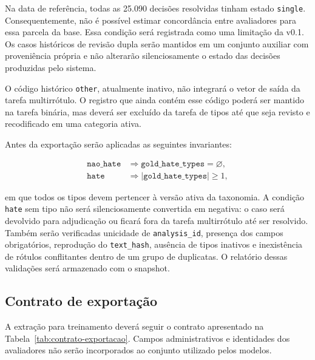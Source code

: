 Na data de referência, todas as 25.090 decisões resolvidas tinham estado
\texttt{single}. Consequentemente, não é possível estimar concordância entre
avaliadores para essa parcela da base. Essa condição será registrada como uma
limitação da v0.1. Os casos históricos de revisão dupla serão mantidos em um
conjunto auxiliar com proveniência própria e não alterarão silenciosamente o
estado das decisões produzidas pelo sistema.

O código histórico \texttt{other}, atualmente inativo, não integrará o vetor de
saída da tarefa multirrótulo. O registro que ainda contém esse código poderá ser
mantido na tarefa binária, mas deverá ser excluído da tarefa de tipos até que
seja revisto e recodificado em uma categoria ativa.

Antes da exportação serão aplicadas as seguintes invariantes:

\begin{align}
    \texttt{nao\_hate} &\Rightarrow
    \texttt{gold\_hate\_types}=\varnothing,\\
    \texttt{hate} &\Rightarrow
    \left|\texttt{gold\_hate\_types}\right|\geq 1,
\end{align}

em que todos os tipos devem pertencer à versão ativa da taxonomia. A condição
\texttt{hate} sem tipo não será silenciosamente convertida em negativa: o caso
será devolvido para adjudicação ou ficará fora da tarefa multirrótulo até ser
resolvido. Também serão verificadas unicidade de \texttt{analysis\_id}, presença
dos campos obrigatórios, reprodução do \texttt{text\_hash}, ausência de tipos
inativos e inexistência de rótulos conflitantes dentro de um grupo de duplicatas.
O relatório dessas validações será armazenado com o snapshot.

\subsection{Contrato de exportação}

A extração para treinamento deverá seguir o contrato apresentado na
Tabela~\ref{tab:contrato-exportacao}. Campos administrativos e identidades dos
avaliadores não serão incorporados ao conjunto utilizado pelos modelos.


